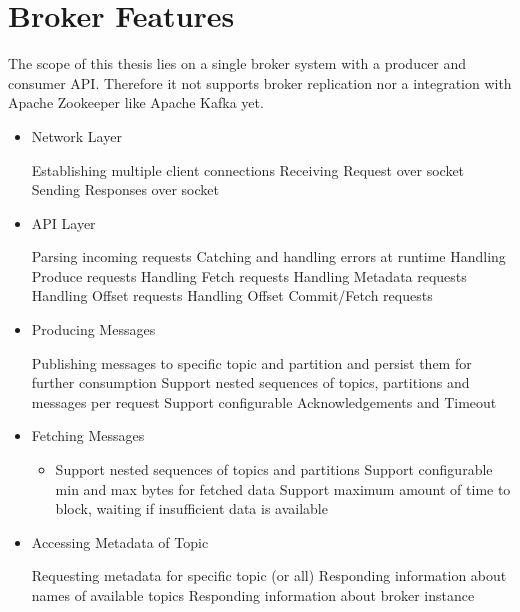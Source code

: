 \newpage
\section{Broker Features}
The scope of this thesis lies on a single broker system with a producer and
consumer API. Therefore it not supports broker replication nor a integration
with Apache Zookeeper like Apache Kafka yet.

\begin{itemize}
    \item Network Layer 
    \begin{itemize}
        \tick Establishing multiple client connections
        \tick Receiving Request over socket
        \tick Sending Responses over socket
    \end{itemize}
    \item API Layer
    \begin{itemize}
        \tick Parsing incoming requests
        \tick Catching and handling errors at runtime 
        \tick Handling Produce requests
        \tick Handling Fetch requests
        \tick Handling Metadata requests
        \fail Handling Offset requests
        \fail Handling Offset Commit/Fetch requests
    \end{itemize}
    \item Producing Messages
    \begin{itemize}
        \tick Publishing messages to specific topic and partition and persist
        them for further consumption
        \tick Support nested sequences of topics, partitions and messages per
        request
        \fail Support configurable Acknowledgements and Timeout
    \end{itemize}
    \item Fetching Messages 
    \begin{itemize}
        \tick Consuming messages of a topic and partition from a specific offset
        on
        \item Support nested sequences of topics and partitions
        \fail Support configurable min and max bytes for fetched data
        \fail Support maximum amount of time to block, waiting if insufficient
        data is available
    \end{itemize}
    \item Accessing Metadata of Topic
    \begin{itemize}
        \tick Requesting metadata for specific topic (or all)
        \tick Responding information about names of available topics
        \tick Responding information about broker instance

\end{itemize}
\end{itemize}
